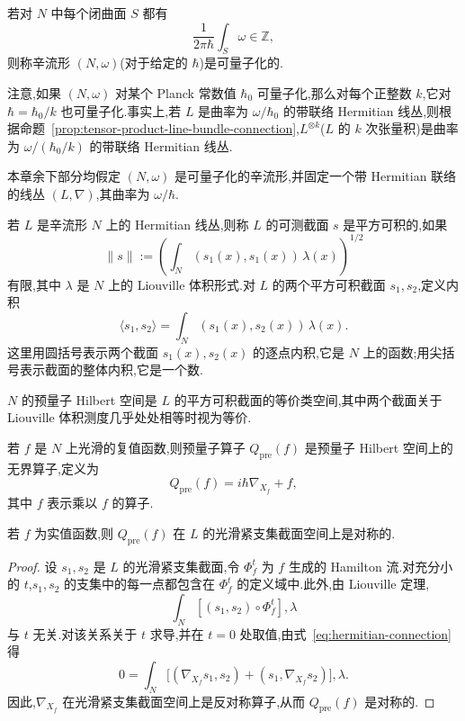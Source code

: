 \begin{definition}[可量子化的辛流形]
\label{def:quantizable-symplectic-manifold}
若对 $N$ 中每个闭曲面 $S$ 都有
\[
 \frac{1}{2\pi\hbar}\int_S\omega\in\mathbb Z,
 \label{eq:quantizable-integrality}
\]
则称辛流形 $(N,\omega)$(对于给定的 $\hbar$)是可量子化的.
\end{definition}

注意,如果 $(N,\omega)$ 对某个 Planck 常数值 $\hbar_0$ 可量子化,那么对每个正整数 $k$,它对 $\hbar=\hbar_0/k$ 也可量子化.事实上,若 $L$ 是曲率为 $\omega/\hbar_0$ 的带联络 Hermitian 线丛,则根据命题~\ref{prop:tensor-product-line-bundle-connection},$L^{\otimes k}$($L$ 的 $k$ 次张量积)是曲率为 $\omega/(\hbar_0/k)$ 的带联络 Hermitian 线丛.

本章余下部分均假定 $(N,\omega)$ 是可量子化的辛流形,并固定一个带 Hermitian 联络的线丛 $(L,\nabla)$,其曲率为 $\omega/\hbar$.

若 $L$ 是辛流形 $N$ 上的 Hermitian 线丛,则称 $L$ 的可测截面 $s$ 是平方可积的,如果
\[
 \|s\|:=\left(\int_N(s_1(x),s_1(x))\,\lambda(x)\right)^{1/2}
\]
有限,其中 $\lambda$ 是 $N$ 上的 Liouville 体积形式.对 $L$ 的两个平方可积截面 $s_1,s_2$,定义内积
\[
 \langle s_1,s_2\rangle
 =\int_N(s_1(x),s_2(x))\,\lambda(x).
 \label{eq:line-bundle-inner-product}
\]
这里用圆括号表示两个截面 $s_1(x),s_2(x)$ 的逐点内积,它是 $N$ 上的函数;用尖括号表示截面的整体内积,它是一个数.

\begin{definition}
\label{def:prequantum-hilbert-space-manifold}
$N$ 的预量子 Hilbert 空间是 $L$ 的平方可积截面的等价类空间,其中两个截面关于 Liouville 体积测度几乎处处相等时视为等价.
\end{definition}

\begin{definition}[流形上的预量子算子]
\label{def:prequantum-operator-manifold}
若 $f$ 是 $N$ 上光滑的复值函数,则预量子算子 $Q_{\mathrm{pre}}(f)$ 是预量子 Hilbert 空间上的无界算子,定义为
\[
 Q_{\mathrm{pre}}(f)=i\hbar\nabla_{X_f}+f,
 \label{eq:manifold-prequantum-operator}
\]
其中 $f$ 表示乘以 $f$ 的算子.
\end{definition}

\begin{proposition}[预量子算子的对称性]
\label{prop:prequantum-manifold-symmetric}
\label{prop:connection-flow}
若 $f$ 为实值函数,则 $Q_{\mathrm{pre}}(f)$ 在 $L$ 的光滑紧支集截面空间上是对称的.
\end{proposition}

\begin{proof}
设 $s_1,s_2$ 是 $L$ 的光滑紧支集截面,令 $\Phi_f^t$ 为 $f$ 生成的 Hamilton 流.对充分小的 $t$,$s_1,s_2$ 的支集中的每一点都包含在 $\Phi_f^t$ 的定义域中.此外,由 Liouville 定理,
\[
 \int_N[(s_1,s_2)\circ\Phi_f^t],\lambda
\]
与 $t$ 无关.对该关系关于 $t$ 求导,并在 $t=0$ 处取值,由式~\eqref{eq:hermitian-connection} 得
\[
 0=\int_N\bigl[(\nabla_{X_f}s_1,s_2)+(s_1,\nabla_{X_f}s_2)\bigr],\lambda.
\]
因此,$\nabla_{X_f}$ 在光滑紧支集截面空间上是反对称算子,从而 $Q_{\mathrm{pre}}(f)$ 是对称的.
\end{proof}

